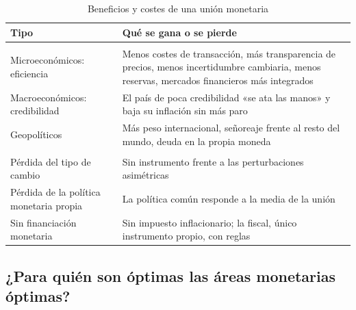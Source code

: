 \documentclass[11pt]{article}
\begin{document}
\begin{table}[H]
\centering
\caption{Beneficios y costes de una unión monetaria}\label{tab:beneficios-costes}
\small\renewcommand{\arraystretch}{1.25}
\begin{tabular}{>{\raggedright\arraybackslash}m{}>{\raggedright\arraybackslash}m{}}
\toprule
\textbf{Tipo} & \textbf{Qué se gana o se pierde}\\
\midrule
\rowcolor{tceeazulpalido}\multicolumn{2}{l}{\textbf{Beneficios}}\\
\textcolor{tceeverde}{Microeconómicos: eficiencia} & Menos costes de transacción, más transparencia de precios, menos incertidumbre cambiaria, menos reservas, mercados financieros más integrados\\
\textcolor{tceeverde}{Macroeconómicos: credibilidad} & El país de poca credibilidad «se ata las manos» y baja su inflación sin más paro\\
\textcolor{tceeverde}{Geopolíticos} & Más peso internacional, señoreaje frente al resto del mundo, deuda en la propia moneda\\
\rowcolor{tceesalmon}\multicolumn{2}{l}{\textbf{Costes}}\\
\textcolor{tceerojo}{Pérdida del tipo de cambio} & Sin instrumento frente a las perturbaciones asimétricas\\
\textcolor{tceerojo}{Pérdida de la política monetaria propia} & La política común responde a la media de la unión\\
\textcolor{tceerojo}{Sin financiación monetaria} & Sin impuesto inflacionario; la fiscal, único instrumento propio, con reglas\\
\bottomrule
\end{tabular}
\end{table}

\subsection{¿Para quién son óptimas las áreas monetarias óptimas?}\label{sec:terceros}
\end{document}
